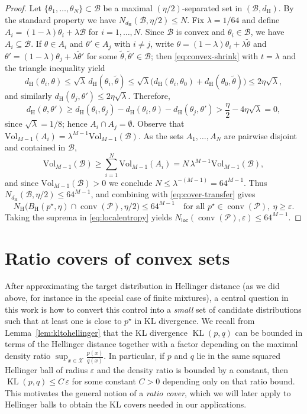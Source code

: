\documentclass[11pt]{article}
\newcommand{\vol}{\mathrm{Vol}}
\renewcommand{\le}{\leqslant}
\renewcommand{\ge}{\geqslant}
\newcommand{\eps}{\varepsilon}
\newcommand{\M}{M}
\newcommand{\nloc}{N_{\mathsf{loc}}}
\newcommand{\conv}{\mathop{\mathrm{conv}}}
\renewcommand{\triangleq}{=}
\renewcommand{\tilde}{\widetilde}
\newcommand{\kl}{\operatorname{KL}}
\newcommand{\kll}[2]{\kl ({#1}, {#2})}
\newcommand{\hel}{\operatorname{H}}
\theoremstyle{definition}
\theoremstyle{remark}
\begin{document}
\begin{proof}
Let $\{\theta_1,\dots,\theta_N\}\subset \mathcal{B}$ be a maximal $(\eta/2)$-separated set in $(\mathcal{B},d_{\hel})$. By the standard property we have $N_{d_{\hel}}(\mathcal{B},\eta/2)\le N$. Fix $\lambda\triangleq 1/64$ and define $A_i\triangleq (1-\lambda)\theta_i+\lambda \mathcal{B}$ for $i=1,\dots,N$. Since $\mathcal{B}$ is convex and $\theta_i\in \mathcal{B}$, we have $A_i\subseteq \mathcal{B}$. If $\theta\in A_i$ and $\theta'\in A_j$ with $i\neq j$, write $\theta=(1-\lambda)\theta_i+\lambda\tilde\theta$ and $\theta'=(1-\lambda)\theta_j+\lambda\tilde\theta'$ for some $\tilde\theta,\tilde\theta'\in \mathcal{B}$; then \eqref{eq:convex-shrink} with $t=\lambda$ and the triangle inequality yield
\[
d_{\hel}(\theta_i,\theta)\le \sqrt{\lambda}\,d_{\hel}(\theta_i,\tilde\theta)
\le \sqrt{\lambda}\big(d_{\hel}(\theta_i,\theta_0)+d_{\hel}(\theta_0,\tilde\theta)\big)\le 2\eta\sqrt{\lambda},
\]
and similarly $d_{\hel}(\theta_j,\theta')\le 2\eta\sqrt{\lambda}$. Therefore,
\[
d_{\hel}(\theta,\theta')\ge d_{\hel}(\theta_i,\theta_j)-d_{\hel}(\theta_i,\theta)-d_{\hel}(\theta_j,\theta')
> \frac{\eta}{2}-4\eta\sqrt{\lambda}=0,
\]
since $\sqrt{\lambda}=1/8$; hence $A_i\cap A_j=\emptyset$. Observe that $\vol_{\M-1}(A_i)=\lambda^{\M-1}\vol_{\M-1}(\mathcal{B})$. As the sets $A_1,\dots,A_N$ are pairwise disjoint and contained in $\mathcal{B}$,
\[
\vol_{\M-1}(\mathcal{B})\ge \sum_{i=1}^N \vol_{\M-1}(A_i)=N\,\lambda^{\M-1}\vol_{\M-1}(\mathcal{B}),
\]
and since $\vol_{\M-1}(\mathcal{B})>0$ we conclude $N\le \lambda^{-(M-1)}=64^{\M-1}$. Thus $N_{d_{\hel}}(\mathcal{B},\eta/2)\le 64^{\M-1}$, and combining with \eqref{eq:cover-transfer} gives
\[
N_{\hel}\big(B_{\hel}(p^\star,\eta)\cap\conv(\mathcal P),\eta/2\big)\le 64^{\M-1}
\quad\text{for all }p^\star\in\conv(\mathcal P),\ \eta\ge\varepsilon.
\]
Taking the suprema in \eqref{eq:localentropy} yields $\nloc(\conv(\mathcal P),\varepsilon)\le 64^{\M-1}$.
\end{proof}



\section{Ratio covers of convex sets}
\label{sec:domin-subs-conv}
After approximating the target distribution in Hellinger distance (as we did above, for instance in
the special case of finite mixtures),
a central question in this work is how to convert this control into a \emph{small} set of candidate distributions such that at least one is close to $p^\star$ in KL divergence. We recall from Lemma~\ref{lem:kltohellinger} that the KL divergence $\kll{p}{q}$ can be bounded in terms of the Hellinger distance together with a factor depending on the maximal density ratio $\sup_{x\in\mathcal X}\frac{p(x)}{q(x)}$. In particular, if $p$ and $q$ lie in the same squared Hellinger ball of radius $\eps$ and the density ratio is bounded by a constant, then $\kll{p}{q}\le C\,\eps$ for some constant $C>0$ depending only on that ratio bound. This motivates the general notion of a \textit{ratio cover}, which we will later apply to Hellinger balls to obtain the KL covers needed in our applications.
\end{document}
